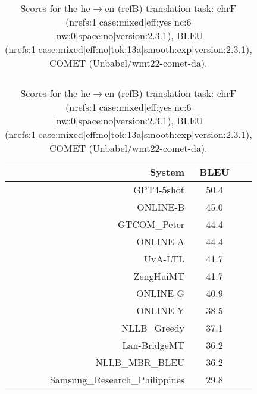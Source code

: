 \documentclass[11pt]{article}
\begin{document}
\begin{table}
\begin{subtable}[t]{0.33\textwidth}
\begin{tabular}{rcc}
\end{tabular} 
\end{subtable} 
\begin{subtable}[t]{0.33\textwidth}
\begin{tabular}{rcc}
\toprule 
System & BLEU \\ 
\midrule 
\rowcolor{ashgrey} GPT4-5shot  & 50.4 \\ 
\rowcolor{ashgrey} ONLINE-B  & 45.0 \\ 
\rowcolor{ashgrey} GTCOM\_Peter & 44.4 \\ 
\rowcolor{ashgrey} ONLINE-A  & 44.4 \\ 
UvA-LTL  & 41.7 \\ 
\rowcolor{ashgrey} ZengHuiMT  & 41.7 \\ 
\rowcolor{ashgrey} ONLINE-G  & 40.9 \\ 
\rowcolor{ashgrey} ONLINE-Y  & 38.5 \\ 
\rowcolor{ashgrey} NLLB\_Greedy & 37.1 \\ 
\rowcolor{ashgrey} Lan-BridgeMT  & 36.2 \\ 
\rowcolor{ashgrey} NLLB\_MBR\_BLEU  & 36.2 \\ 
Samsung\_Research\_Philippines  & 29.8 \\ 
\bottomrule 
\end{tabular} 
\end{subtable} 
\caption{Scores for the he$\rightarrow$en (refB) translation task: chrF (nrefs:1|case:mixed|eff:yes|nc:6 |nw:0|space:no|version:2.3.1), BLEU (nrefs:1|case:mixed|eff:no|tok:13a|smooth:exp|version:2.3.1), COMET (Unbabel/wmt22-comet-da).} 
\end{table} 
\end{document}
